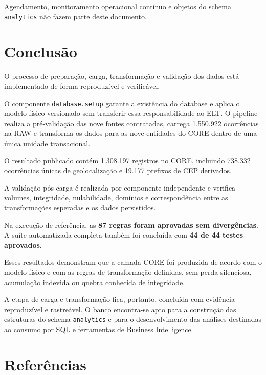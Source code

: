 \documentclass[12pt,a4paper]{article}
\begin{document}
	Agendamento, monitoramento operacional contínuo e objetos do schema
	\texttt{analytics} não fazem parte deste documento.
	
	\section{Conclusão}
	
	O processo de preparação, carga, transformação e validação dos dados está
	implementado de forma reproduzível e verificável.
	
	O componente \texttt{database.setup} garante a existência do database e aplica
	o modelo físico versionado sem transferir essa responsabilidade ao ELT. O
	pipeline realiza a pré-validação das nove fontes contratadas, carrega
	1.550.922 ocorrências na RAW e transforma os dados para as nove entidades do
	CORE dentro de uma única unidade transacional.
	
	O resultado publicado contém 1.308.197 registros no CORE, incluindo 738.332
	ocorrências únicas de geolocalização e 19.177 prefixos de CEP derivados.
	
	A validação pós-carga é realizada por componente independente e verifica
	volumes, integridade, nulabilidade, domínios e correspondência entre as
	transformações esperadas e os dados persistidos.
	
	Na execução de referência, as \textbf{87 regras foram aprovadas sem
		divergências}. A suíte automatizada completa também foi concluída com
	\textbf{44 de 44 testes aprovados}.
	
	Esses resultados demonstram que a camada CORE foi produzida de acordo com o
	modelo físico e com as regras de transformação definidas, sem perda
	silenciosa, acumulação indevida ou quebra conhecida de integridade.
	
	A etapa de carga e transformação fica, portanto, concluída com evidência
	reproduzível e rastreável. O banco encontra-se apto para a construção das
	estruturas do schema \texttt{analytics} e para o desenvolvimento das análises
	destinadas ao consumo por SQL e ferramentas de Business Intelligence.
	
	
	\section{Referências}
	
\end{document}
